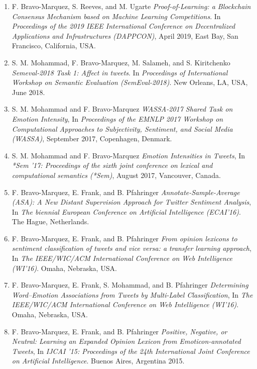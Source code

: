\documentclass[letterpaper]{article}
\begin{document}
\begin{enumerate}

\item F. Bravo-Marquez, S. Reeves, and M. Ugarte \textit{Proof-of-Learning: a Blockchain Consensus Mechanism based on Machine Learning Competitions}. In \textit{Proceedings of the 2019 IEEE International Conference on Decentralized Applications and Infrastructures (DAPPCON)}, April 2019, East Bay, San Francisco, California, USA.

\item S. M. Mohammad, F. Bravo-Marquez, M. Salameh, and S. Kiritchenko \textit{Semeval-2018 Task 1: Affect in tweets}. In \textit{Proceedings of International Workshop on Semantic Evaluation (SemEval-2018)}. New Orleans, LA, USA, June 2018. 

\item  S. M. Mohammad and F. Bravo-Marquez \textit{WASSA-2017 Shared Task on Emotion Intensity}, In \textit{Proceedings of the EMNLP 2017 Workshop on Computational Approaches to Subjectivity, Sentiment, and Social Media (WASSA)}, September 2017, Copenhagen, Denmark. 

\item S. M. Mohammad and F. Bravo-Marquez \textit{Emotion Intensities in Tweets}, In \textit{*Sem '17: Proceedings of the sixth joint conference on lexical and computational semantics (*Sem)}, August 2017, Vancouver, Canada. 


\item F. Bravo-Marquez, E. Frank, and B. Pfahringer \textit{Annotate-Sample-Average (ASA): A New Distant
Supervision Approach for Twitter Sentiment Analysis}, In \textit{The biennial European Conference  on Artificial Intelligence (ECAI'16)}. The Hague, Netherlands.


\item F. Bravo-Marquez, E. Frank, and B. Pfahringer \textit{From opinion lexicons to sentiment classification of
tweets and vice versa: a transfer learning approach}, In \textit{The IEEE/WIC/ACM International Conference on Web Intelligence (WI'16)}. Omaha, Nebraska, USA.


\item F. Bravo-Marquez, E. Frank, S. Mohammad, and B. Pfahringer \textit{Determining Word--Emotion Associations from Tweets by Multi-Label Classification}, In \textit{The IEEE/WIC/ACM International Conference on Web Intelligence (WI'16)}. Omaha, Nebraska, USA.

\item F. Bravo-Marquez, E. Frank, and B. Pfahringer \textit{Positive, Negative, or Neutral: Learning an Expanded Opinion Lexicon from Emoticon-annotated Tweets}, In \textit{IJCAI '15: Proceedings of the 24th International Joint Conference on Artificial Intelligence}. Buenos Aires, Argentina 2015.


\end{enumerate}
\end{document}

